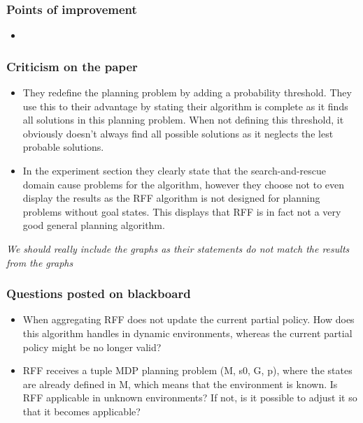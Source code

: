 \documentclass[runningheads,a4paper]{llncs}
\begin{document}
\subsubsection{Points of improvement}

\begin{itemize}
	\item
\end{itemize}

\subsubsection{Criticism on the paper}
\begin{itemize}
	\item They redefine the planning problem by adding a probability threshold. They use this to their advantage by stating their algorithm is complete as it finds all solutions in this planning problem. When not defining this threshold, it obviously doesn't always find all possible solutions as it neglects the lest probable solutions.
	\item In the experiment section they clearly state that the search-and-rescue domain cause problems for the algorithm, however they choose not to even display the results as the RFF algorithm is not designed for planning problems without goal states. This displays that RFF is in fact not a very good general planning algorithm.
\end{itemize}

\emph{ We should really include the graphs as their statements do not match the results from the graphs}

\subsubsection{Questions posted on blackboard}
\begin{itemize}
\item When aggregating RFF does not update the current partial policy. How does this algorithm handles in dynamic environments, whereas the current partial policy might be no longer valid?

\item RFF receives a tuple MDP planning problem (M, s0, G, p), where the states are already defined in M, which means that the environment is known.
Is RFF applicable in unknown environments? If not, is it possible to adjust it so that it becomes applicable?
\end{itemize}
\end{document}
